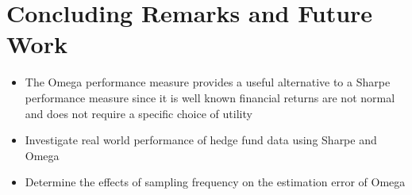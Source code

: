 \documentclass{beamer}
\begin{document}
\section{Concluding Remarks and Future Work}
\begin{frame}
\begin{itemize}
\item The Omega performance measure provides a useful alternative to a Sharpe performance measure since it is well known financial returns are not normal and does not require a specific choice of utility
\item Investigate real world performance of hedge fund data using Sharpe and Omega
\item Determine the effects of sampling frequency on the estimation error of Omega
\end{itemize}
\end{frame}

\begin{frame}
    
    
\end{frame}

%
%
\end{document}
